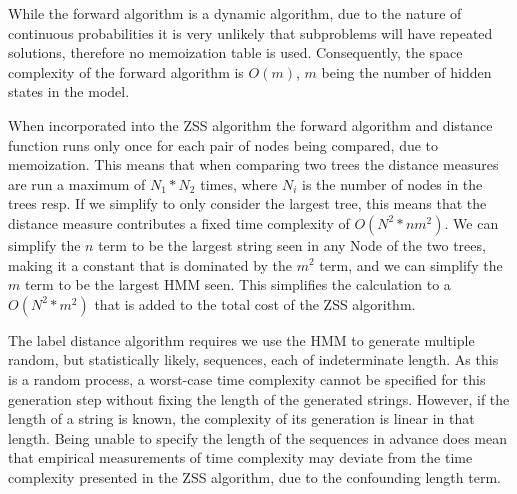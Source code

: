 While the forward algorithm is a dynamic algorithm, due to the nature of continuous probabilities
it is very unlikely that subproblems will have repeated solutions, therefore no memoization table is used. 
Consequently, the space complexity of the forward algorithm is $O(m)$, $m$ being the number of hidden states in the model.

When incorporated into the ZSS algorithm the forward algorithm and distance function runs only once for each pair of nodes being compared, due to memoization. 
This means that when comparing two trees the distance measures are run a maximum of $N_1*N_2$ times, where $N_i$ is the number of 
nodes in the trees resp. If we simplify to only consider the largest tree, this means that the distance measure contributes a fixed time complexity of $O(N^2*nm^2)$. We can simplify 
the $n$ term to be the largest string seen in any Node of the two trees, making it a constant that is dominated by the $m^2$ term, and we can simplify the $m$ term to be the largest HMM seen. 
This simplifies the calculation to a $O(N^2*m^2)$ that is added to the total cost of the ZSS algorithm.

The label distance algorithm requires we use the HMM to generate multiple random, but statistically likely, sequences, each of
indeterminate length. As this is a random process, a worst-case time complexity cannot
be specified for this generation step without fixing the length of the generated strings. However, if the length
of a string is known, the complexity of its generation is linear in that length. Being unable to specify the length of the sequences in advance does mean that empirical measurements of time complexity may deviate from the 
time complexity presented in the ZSS algorithm, due to the confounding length term.